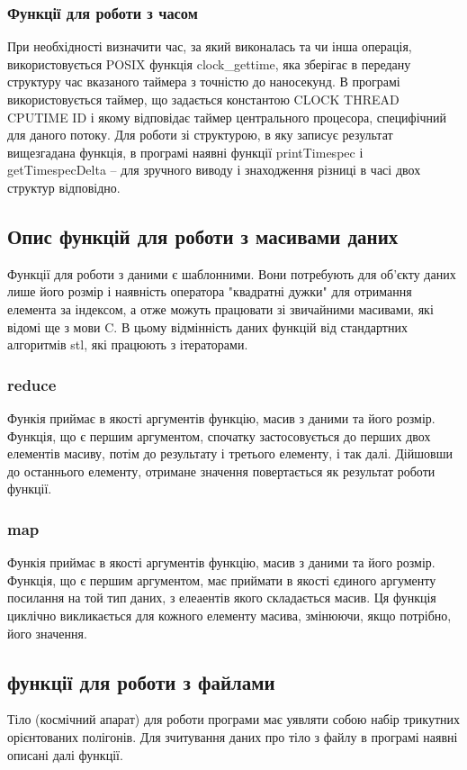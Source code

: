 \documentclass[a4paper,12pt]{article}
\begin{document}
\subsubsection{Функції для роботи з часом}
При необхідності визначити час, за який виконалась та чи інша операція, використовується POSIX функція clock\_gettime, яка зберігає в передану структуру час вказаного таймера з точністю до наносекунд. В програмі використовується таймер, що задається константою CLOCK THREAD CPUTIME ID і якому відповідає таймер центрального процесора, специфічний для даного потоку. Для роботи зі структурою, в яку записує результат вищезгадана функція, в програмі наявні функції printTimespec і getTimespecDelta -- для зручного виводу і знаходження різниці в часі двох структур відповідно.

\subsection{Опис функцій для роботи з масивами даних}
Функції для роботи з даними є шаблонними. Вони потребують для об’єкту даних лише його розмір і наявність оператора "квадратні дужки" для отримання елемента за індексом, а отже можуть працювати зі звичайними масивами, які відомі ще з мови C. В цьому відмінність даних функцій від стандартних алгоритмів stl, які працюють з ітераторами.

\subsubsection{reduce}
Функія приймає в якості аргументів функцію, масив з даними та його розмір. Функція, що є першим аргументом, спочатку застосовується до перших двох елементів масиву, потім до результату і третього елементу, і так далі. Дійшовши до останнього елементу, отримане значення повертається як результат роботи функції.

\subsubsection{map}
Функія приймає в якості аргументів функцію, масив з даними та його розмір. Функція, що є першим аргументом, має приймати в якості єдиного аргументу посилання на той тип даних, з елеаентів якого складається масив. Ця функція циклічно викликається для кожного елементу масива, змінюючи, якщо потрібно, його значення.

\subsection{функції для роботи з файлами} \label{sec:file}
Тіло (космічний апарат) для роботи програми має уявляти собою набір трикутних орієнтованих полігонів. Для зчитування даних про тіло з файлу в програмі наявні описані далі функції.
\end{document}
